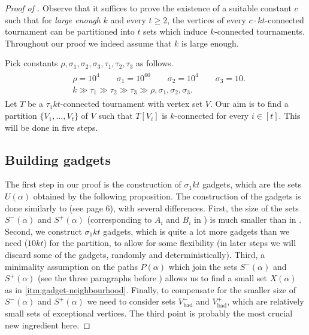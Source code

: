 \documentclass[english]{article}
\theoremstyle{plain}
\theoremstyle{remark}
\def \Sp {S^+}
\def \Sm {S^-}
\def \Vbp {V_{\bad}^+}
\def \Vbm {V_{\bad}^-}
\DeclareMathOperator{\bad}{bad}
\begin{document}
	\begin{proof}[Proof of ]
		Observe that it suffices to prove the existence of a suitable constant $c$ such that for \emph{large enough} $k$ and every $t \ge 2$, the vertices of every $c \cdot kt$-connected tournament can be partitioned into $t$ sets which induce $k$-connected tournaments. Throughout our proof we indeed assume that $k$ is large enough.

		Pick constants $\rho, \sigma_1, \sigma_2, \sigma_3, \tau_1, \tau_2, \tau_3$ as follows.
		\begin{align} \label{eqn:values}
			\begin{split}
				& \rho = 10^4 \qquad \sigma_1 = 10^{60} \qquad \sigma_2 = 10^4 \qquad \sigma_3 = 10. \\
				& k \gg \tau_1 \gg \tau_2 \gg \tau_3 \gg \rho, \sigma_1, \sigma_2, \sigma_3.
			\end{split}
		\end{align}
		Let $T$ be a $\tau_1 kt$-connected tournament with vertex set $V$.
		Our aim is to find a partition $\{V_1, \ldots, V_t\}$ of $V$ such that $T[V_i]$ is $k$-connected for every $i \in [t]$. This will be done in five steps.


	\subsection{Building gadgets} \label{subsec:gadgets}
		The first step in our proof is the construction of $\sigma_1 kt$ gadgets, which are the sets $U(\alpha)$ obtained by the following proposition.
		The construction of the gadgets is done similarly to \cite{kuhn2016proof} (see page 6), with several differences. First, the size of the sets $\Sm(\alpha)$ and $\Sp(\alpha)$ (corresponding to $A_i$ and $B_i$ in \cite{kuhn2016proof}) is much smaller than in \cite{kuhn2016proof}. Second, we construct $\sigma_1 kt$ gadgets, which is quite a lot more gadgets than we need ($10kt$) for the partition, to allow for some flexibility (in later steps we will discard some of the gadgets, randomly and deterministically). Third, a minimality assumption on the paths $P(\alpha)$ which join the sets $\Sm(\alpha)$ and $\Sp(\alpha)$ (see the three paragraphs before ) allows us to find a small set $X(\alpha)$ as in \ref{itm:gadget-neighbourhood}. Finally, to compensate for the smaller size of $\Sm(\alpha)$ and $\Sp(\alpha)$ we need to consider sets $\Vbm$ and $\Vbp$, which are relatively small sets of exceptional vertices. The third point is probably the most crucial new ingredient here.


\end{proof}
\end{document}
